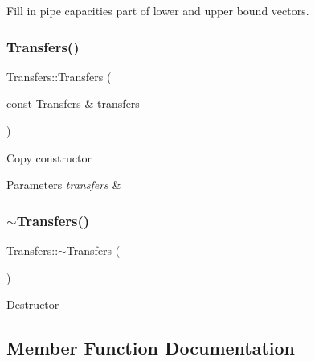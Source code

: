 Fill in pipe capacities part of lower and upper bound vectors. \mbox{\label{classTransfers_af88f7908692240eec9f3179128c6f343_af88f7908692240eec9f3179128c6f343}} 
\subsubsection{\texorpdfstring{Transfers()}{Transfers()}\hspace{0.1cm}{\footnotesize\ttfamily [2/2]}}
{\footnotesize\ttfamily Transfers\+::\+Transfers (\begin{DoxyParamCaption}\item[{const \mbox{\hyperlink{classTransfers}{Transfers}} \&}]{transfers }\end{DoxyParamCaption})}

Copy constructor 
\begin{DoxyParams}{Parameters}
{\em transfers} & \\
\hline
\end{DoxyParams}
\mbox{\label{classTransfers_a5dfeafe7a9b9a446b1ab746b65ef3b4b_a5dfeafe7a9b9a446b1ab746b65ef3b4b}} 
\subsubsection{\texorpdfstring{$\sim$\+Transfers()}{~Transfers()}}
{\footnotesize\ttfamily Transfers\+::$\sim$\+Transfers (\begin{DoxyParamCaption}{ }\end{DoxyParamCaption})}

Destructor 

\subsection{Member Function Documentation}
\mbox{\label{classTransfers_a3c1930dbeb1273c1c0be93ad5ca57357_a3c1930dbeb1273c1c0be93ad5ca57357}} 
